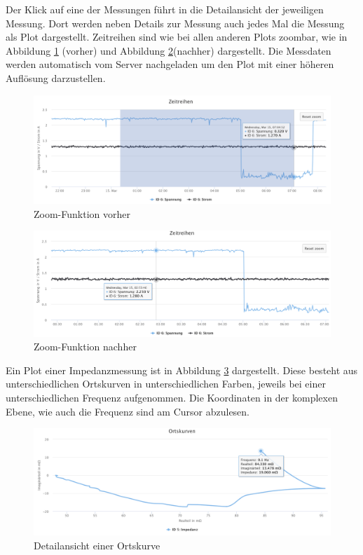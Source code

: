 Der Klick auf eine der Messungen führt in die Detailansicht der jeweiligen Messung. Dort werden neben Details zur Messung auch jedes Mal die Messung als Plot dargestellt. Zeitreihen sind wie bei allen anderen Plots zoombar, wie in Abbildung \ref{fig:zoomvorher} (vorher) und Abbildung \ref{fig:zoomnachher}(nachher) dargestellt. Die Messdaten werden automatisch vom Server nachgeladen um den Plot mit einer höheren Auflösung darzustellen.

\begin{figure}
\centering
\includegraphics[width=\textwidth]{Figures/zoomvorher}
\caption{Zoom-Funktion vorher}
\label{fig:zoomvorher}
\end{figure} 

\begin{figure}
\centering
\includegraphics[width=\textwidth]{Figures/zoomnachher}
\caption{Zoom-Funktion nachher}
\label{fig:zoomnachher}
\end{figure} 


Ein Plot einer Impedanzmessung ist in Abbildung \ref{fig:ortskurve} dargestellt. Diese besteht aus unterschiedlichen Ortskurven in unterschiedlichen Farben, jeweils bei einer unterschiedlichen Frequenz aufgenommen. Die Koordinaten in der komplexen Ebene, wie auch die Frequenz sind am Cursor abzulesen. 

\begin{figure}
\centering
\includegraphics[width=\textwidth]{Figures/ortskurve}
\caption{Detailansicht einer Ortskurve}
\label{fig:ortskurve}
\end{figure}

